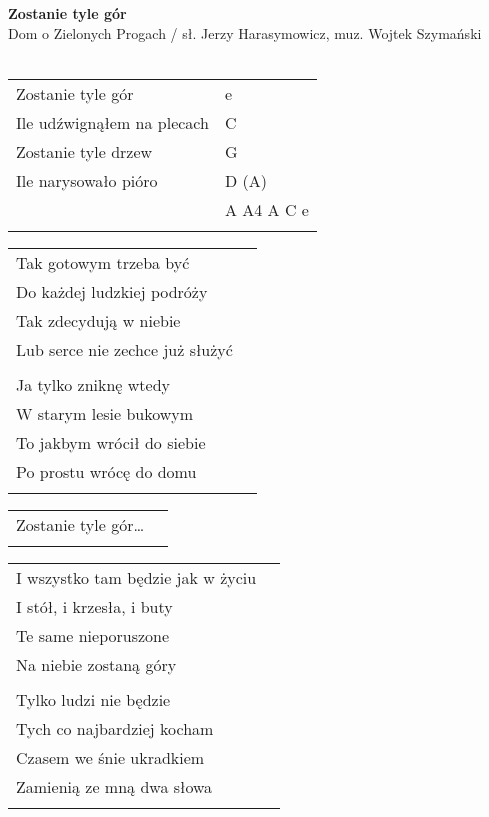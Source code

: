 \documentclass[a5paper]{article}
\begin{document}


\noindent
\fontsize{12pt}{15pt}\selectfont
\textbf{Zostanie tyle gór} \\
\fontsize{8pt}{10pt}\selectfont
Dom o Zielonych Progach / sł. Jerzy Harasymowicz, muz. Wojtek Szymański \\ \\
\fontsize{10pt}{12pt}\selectfont

\begin{tabular}{@{}p{5.50cm}p{3cm}@{}}
\noindent
Zostanie tyle gór & e \\
Ile udźwignąłem na plecach & C \\
Zostanie tyle drzew & G \\
Ile narysowało pióro & D (A) \\
& A A4 A C e \\ \\
\end{tabular}

\noindent
\begin{tabular}{@{}p{5.50cm}p{3cm}@{}}
Tak gotowym trzeba być \\
Do każdej ludzkiej podróży \\
Tak zdecydują w niebie \\
Lub serce nie zechce już służyć \\ \\

Ja tylko zniknę wtedy \\ 
W starym lesie bukowym \\
To jakbym wrócił do siebie \\
Po prostu wrócę do domu \\ \\
\end{tabular}

\noindent
\begin{tabular}{@{}p{4.50cm}p{3cm}@{}}
Zostanie tyle gór… \\ \\
\end{tabular}

\noindent
\begin{tabular}{@{}p{5.50cm}p{3cm}@{}}
I wszystko tam będzie jak w życiu \\
I stół, i krzesła, i buty \\
Te same nieporuszone \\
Na niebie zostaną góry \\ \\

Tylko ludzi nie będzie \\
Tych co najbardziej kocham \\
Czasem we śnie ukradkiem \\
Zamienią ze mną dwa słowa \\ \\
\end{tabular}
\end{document}
